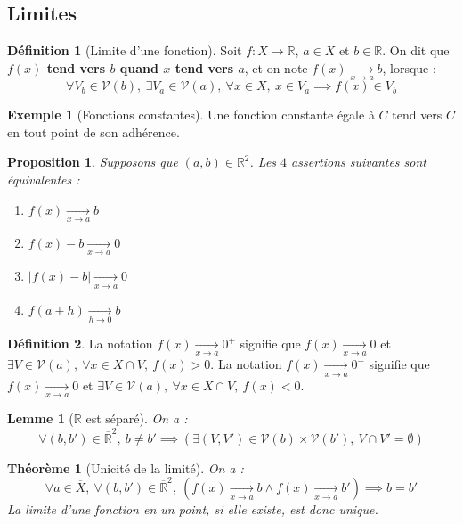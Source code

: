 \documentclass[french]{book}
\newcommand{\R}{\mathbb{R}}
\theoremstyle{plain}
\newtheorem{thm}{Théorème}[chapter]
\newtheorem{lem}{Lemme}[chapter]
\newtheorem{prop}{Proposition}[chapter]
\theoremstyle{definition}
\newtheorem{dfn}{Définition}[chapter]
\newtheorem{exa}{Exemple}[chapter]
\theoremstyle{remark}
\begin{document}
\subsection{Limites}
\begin{dfn}[Limite d'une fonction]
	Soit $f:X\rightarrow\R$, $a\in\overline{X}$ et $b\in\overline{\R}$. On dit que \textbf{$f(x)$ tend vers $b$ quand $x$ tend vers $a$}, et on note $f(x)\xrightarrow[x\to a]{}b$, lorsque : $$\forall V_b\in\mathcal{V}(b),\ \exists V_a\in\mathcal{V}(a),\ \forall x\in X,\ x\in V_a\implies f(x)\in V_b$$
\end{dfn}
\begin{exa}[Fonctions constantes]
	Une fonction constante égale à $C$ tend vers $C$ en tout point de son adhérence.
\end{exa}
\begin{prop}
	Supposons que $(a,b)\in\R^2$. Les $4$ assertions suivantes sont équivalentes :
	\begin{enumerate}
		\item $f(x)\xrightarrow[x\to a]{}b$
		\item $f(x)-b\xrightarrow[x\to a]{}0$
		\item $\lvert f(x)-b\rvert\xrightarrow[x\to a]{}0$
		\item $f(a+h)\xrightarrow[h\to 0]{}b$
	\end{enumerate}
\end{prop}
\begin{dfn}
	La notation $f(x)\xrightarrow[x\to a]{}0^+$ signifie que $f(x)\xrightarrow[x\to a]{}0$ et $\exists V\in\mathcal{V}(a),\ \forall x\in X\cap V,\ f(x)>0$. La notation $f(x)\xrightarrow[x\to a]{}0^-$ signifie que $f(x)\xrightarrow[x\to a]{}0$ et $\exists V\in\mathcal{V}(a),\ \forall x\in X\cap V,\ f(x)<0$.
\end{dfn}
\begin{lem}[$\overline{\R}$ est séparé]
	On a : $$\forall(b,b')\in\overline{\R}^2,\ b\ne b'\implies\left(\exists(V,V')\in\mathcal{V}(b)\times\mathcal{V}(b'),\ V\cap V'=\emptyset\right)$$
\end{lem}
\begin{thm}[Unicité de la limité]
	On a : $$\forall a\in\overline{X},\ \forall(b,b')\in\overline{\R}^2,\ (f(x)\xrightarrow[x\to a]{}b\land f(x)\xrightarrow[x\to a]{}b')\implies b=b'$$ La limite d'une fonction en un point, si elle existe, est donc unique.
\end{thm}
\end{document}
